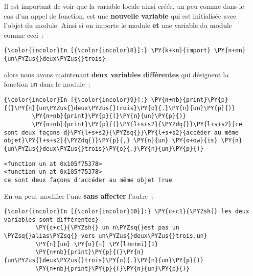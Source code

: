     Il est important de voir que la variable locale ainsi créée, un peu
comme dans le cas d'un appel de fonction, est une \textbf{nouvelle
variable} qui est initialisée avec l'objet du module. Ainsi si on
importe le module \textbf{et} une variable du module comme ceci~:

    \begin{Verbatim}[commandchars=\\\{\},frame=single,framerule=0.3mm,rulecolor=\color{cellframecolor}]
{\color{incolor}In [{\color{incolor}8}]:} \PY{k+kn}{import} \PY{n+nn}{un\PYZus{}deux\PYZus{}trois}
\end{Verbatim}


    alors nous avons maintenant \textbf{deux variables différentes} qui
désignent la fonction \texttt{un} dans le module~:

    \begin{Verbatim}[commandchars=\\\{\},frame=single,framerule=0.3mm,rulecolor=\color{cellframecolor}]
{\color{incolor}In [{\color{incolor}9}]:} \PY{n+nb}{print}\PY{p}{(}\PY{n}{un\PYZus{}deux\PYZus{}trois}\PY{o}{.}\PY{n}{un}\PY{p}{)}
        \PY{n+nb}{print}\PY{p}{(}\PY{n}{un}\PY{p}{)}
        \PY{n+nb}{print}\PY{p}{(}\PY{l+s+s2}{\PYZdq{}}\PY{l+s+s2}{ce sont deux façons d}\PY{l+s+s2}{\PYZsq{}}\PY{l+s+s2}{accéder au même objet}\PY{l+s+s2}{\PYZdq{}}\PY{p}{,} \PY{n}{un} \PY{o+ow}{is} \PY{n}{un\PYZus{}deux\PYZus{}trois}\PY{o}{.}\PY{n}{un}\PY{p}{)}
\end{Verbatim}


    \begin{Verbatim}[commandchars=\\\{\},frame=single,framerule=0.3mm,rulecolor=\color{cellframecolor}]
<function un at 0x105f75378>
<function un at 0x105f75378>
ce sont deux façons d'accéder au même objet True
\end{Verbatim}

    En on peut modifier l'une \textbf{sans affecter} l'autre~:

    \begin{Verbatim}[commandchars=\\\{\},frame=single,framerule=0.3mm,rulecolor=\color{cellframecolor}]
{\color{incolor}In [{\color{incolor}10}]:} \PY{c+c1}{\PYZsh{} les deux variables sont différentes}
         \PY{c+c1}{\PYZsh{} un n\PYZsq{}est pas un \PYZsq{}alias\PYZsq{} vers un\PYZus{}deux\PYZus{}trois.un}
         \PY{n}{un} \PY{o}{=} \PY{l+m+mi}{1}
         \PY{n+nb}{print}\PY{p}{(}\PY{n}{un\PYZus{}deux\PYZus{}trois}\PY{o}{.}\PY{n}{un}\PY{p}{)}
         \PY{n+nb}{print}\PY{p}{(}\PY{n}{un}\PY{p}{)}
\end{Verbatim}


